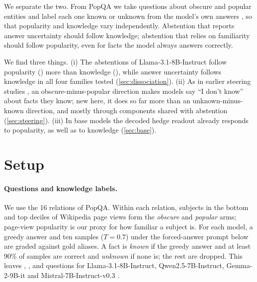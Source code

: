 \documentclass{article}
\newcommand{\idk}{``I don't know''}
\begin{document}
We separate the two. From PopQA \citep{mallen2023popqa} we take questions about obscure and popular entities and label each one known or unknown from the model's own answers \citep{gekhman2024slick}, so that popularity and knowledge vary independently. Abstention that reports answer uncertainty should follow knowledge; abstention that relies on familiarity should follow popularity, even for facts the model always answers correctly.

We find three things. (i) The abstentions of Llama-3.1-8B-Instruct follow popularity (\hmLlamaPopEff) more than knowledge (\hmLlamaKnowEff), while answer uncertainty follows knowledge in all four families tested (\cref{sec:dissociation}). (ii) As in earlier steering studies \citep{ferrando2025iknow,brzezinka2026familiarity}, an obscure-minus-popular direction makes models say \idk{} about facts they know; new here, it does so far more than an unknown-minus-known direction, and mostly through components shared with abstention (\cref{sec:steering}). (iii) In base models the decoded hedge readout already responds to popularity, as well as to knowledge (\cref{sec:base}).

\section{Setup}
\label{sec:setup}

\paragraph{Questions and knowledge labels.} We use the 16 relations of PopQA. Within each relation, subjects in the bottom and top deciles of Wikipedia page views form the \emph{obscure} and \emph{popular} arms; page-view popularity is our proxy for how familiar a subject is. For each model, a greedy answer and ten samples ($T=0.7$) under the forced-answer prompt below are graded against gold aliases. A fact is \emph{known} if the greedy answer and at least 90\% of samples are correct and \emph{unknown} if none is; the rest are dropped. This leaves \faLlamaN, \faQwenN, \faGemmaN{} and \faMistralN{} questions for Llama-3.1-8B-Instruct, Qwen2.5-7B-Instruct, Gemma-2-9B-it and Mistral-7B-Instruct-v0.3 \citep{llama3,qwen25,gemma2,mistral7b}.
\end{document}
